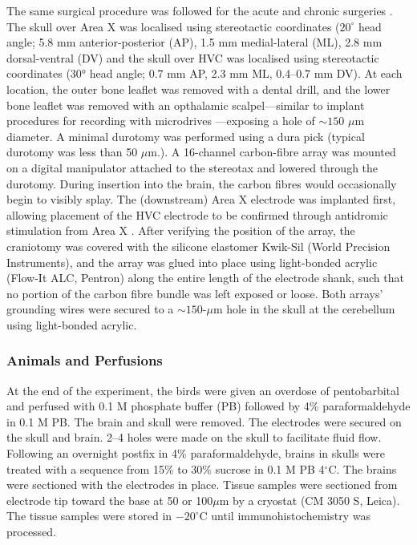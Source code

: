 \documentclass[10pt,letterpaper]{article}
\begin{document}
The same surgical procedure was followed for the acute and chronic
surgeries \cite{Guitchounts2013electrode}. The skull
over Area X was localised using stereotactic coordinates ($20^\circ$ head
angle; 5.8 mm anterior-posterior (AP), 1.5 mm medial-lateral (ML), 2.8 mm dorsal-ventral (DV) and the skull over HVC was
localised using stereotactic coordinates (30° head angle; 0.7 mm AP,
2.3 mm ML, 0.4--0.7 mm DV). At each location, the outer bone leaflet was removed with a dental drill, and the lower bone
leaflet was removed with an opthalamic scalpel---similar to
implant procedures for recording with microdrives
\cite{Long2010synfire}---exposing a hole of $\sim 150$ $\mu$m diameter. A
minimal durotomy was performed using a dura pick (typical durotomy was
less than 50 $\mu$m.). A 16-channel carbon-fibre array
\cite{Guitchounts2013electrode} was mounted on a digital manipulator
attached to the stereotax and lowered through the
durotomy. During insertion into the brain, the carbon fibres would
occasionally begin to visibly splay. The (downstream) Area X electrode was implanted first, allowing placement of the HVC electrode to be confirmed through antidromic stimulation from Area X
\cite{Hahnloser2002sparse,Guitchounts2013electrode}.  After verifying
the position of the array, the craniotomy was covered with the
silicone elastomer Kwik-Sil (World Precision Instruments), and the
array was glued into place using light-bonded acrylic (Flow-It ALC,
Pentron) along the entire length of the electrode shank, such that no
portion of the carbon fibre bundle was left exposed or loose. Both arrays’
grounding wires were secured to a $\sim
150$-$\mu$m hole in the skull at the cerebellum using light-bonded acrylic.

\subsubsection{Animals and Perfusions}

At the end of the experiment, the birds were given an overdose of
pentobarbital and perfused with 0.1 M phosphate buffer (PB) followed by 4\%
paraformaldehyde in 0.1 M PB.  The brain and skull were removed. The
electrodes were secured on the skull and brain. 2--4 holes were made
on the skull to facilitate fluid flow. Following an
overnight postfix in 4\% paraformaldehyde, brains in skulls were
treated with a sequence from 15\% to 30\% sucrose in 0.1 M PB 4$^\circ$C.
The brains were sectioned with the electrodes in place. Tissue samples
were sectioned from electrode tip toward the base at
50 or 100$\mu$m by a cryostat (CM 3050 S, Leica). The tissue samples
were stored in $-20^\circ$C until immunohistochemistry was processed.
\end{document}
